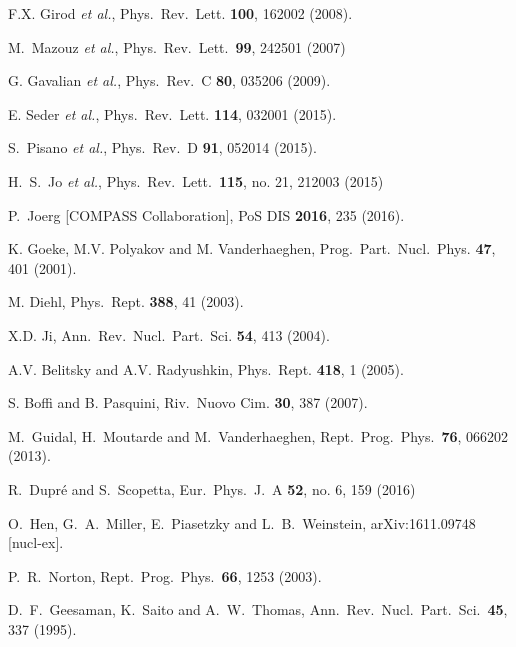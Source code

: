 \documentclass[twocolumn,nofootinbib,showpacs,prl,superscriptaddress,secnumarabic,amssymb,nobibnotes,aps,floatfix]{revtex4}
\begin{document}
\begin{thebibliography}{99}
F.X. Girod {\it et al.},
Phys.\ Rev.\ Lett. {\bf 100}, 162002 (2008).

   M.~Mazouz {\it et al.},
   Phys.\ Rev.\ Lett.\  {\bf 99}, 242501 (2007)

G. Gavalian {\it et al.},
Phys.\ Rev.\ C {\bf 80}, 035206 (2009).

E. Seder {\it et al.},
Phys.\ Rev.\ Lett. {\bf 114}, 032001 (2015).

S.~Pisano {\it et al.},
Phys.\ Rev.\ D {\bf 91}, 052014 (2015).

H.~S.~Jo {\it et al.},
  Phys.\ Rev.\ Lett.\  {\bf 115}, no. 21, 212003 (2015)

  P.~Joerg [COMPASS Collaboration],
  PoS DIS {\bf 2016}, 235 (2016).

K. Goeke, M.V. Polyakov and M. Vanderhaeghen,
Prog.\ Part.\ Nucl.\ Phys. {\bf 47}, 401 (2001).

M. Diehl,
Phys.\ Rept.  {\bf 388}, 41 (2003).

X.D. Ji,
Ann.\ Rev.\ Nucl.\ Part.\ Sci. {\bf 54}, 413 (2004).

A.V. Belitsky and A.V. Radyushkin,
Phys.\ Rept. {\bf 418}, 1 (2005).

 S. Boffi and B. Pasquini,
Riv.\ Nuovo Cim. {\bf 30}, 387 (2007).

M.~Guidal, H.~Moutarde and M.~Vanderhaeghen,
Rept.\ Prog.\ Phys.\  {\bf 76}, 066202 (2013).

  R.~Dupr\'e and S.~Scopetta,
  Eur.\ Phys.\ J.\ A {\bf 52}, no. 6, 159 (2016)

  O.~Hen, G.~A.~Miller, E.~Piasetzky and L.~B.~Weinstein,
  arXiv:1611.09748 [nucl-ex].

  P.~R.~Norton,
  Rept.\ Prog.\ Phys.\  {\bf 66}, 1253 (2003).

  D.~F.~Geesaman, K.~Saito and A.~W.~Thomas,
  Ann.\ Rev.\ Nucl.\ Part.\ Sci.\  {\bf 45}, 337 (1995).


\end{thebibliography}
\end{document}
